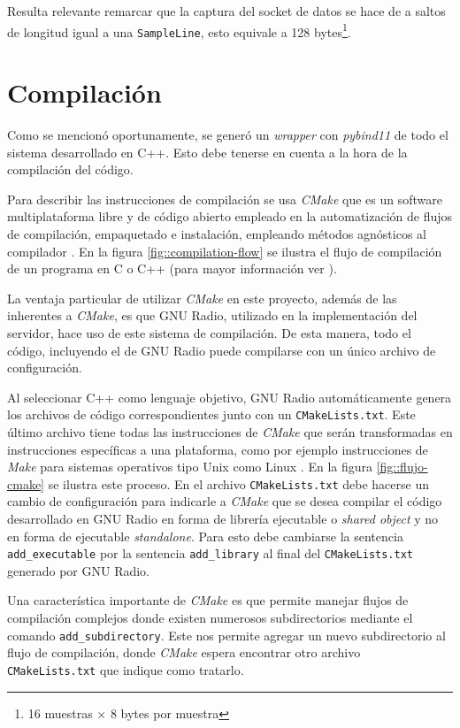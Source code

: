 \documentclass[../../main.tex]{subfiles}
\begin{document}
Resulta relevante remarcar que la captura del socket de datos se hace de a saltos de longitud igual a una \texttt{SampleLine}, esto equivale a 128 bytes\footnote{16 muestras $\times$ 8 bytes por muestra}.

\section{Compilación}
Como se mencionó oportunamente, se generó un \textit{wrapper} con \textit{pybind11} de todo el sistema desarrollado en C++. Esto debe tenerse en cuenta a la hora de la compilación del código.

Para describir las instrucciones de compilación se usa \textit{CMake} que es un software multiplataforma libre y de código abierto empleado en la automatización de flujos de compilación, empaquetado e instalación, empleando métodos agnósticos al compilador \cite{CMake}. En la figura \ref{fig::compilation-flow} se ilustra el flujo de compilación de un programa en C o C++ (para mayor información ver \cite{computer-systems}).

La ventaja particular de utilizar \textit{CMake} en este proyecto, además de las inherentes a \textit{CMake}, es que GNU Radio, utilizado en la implementación del servidor, hace uso de este sistema de compilación. De esta manera, todo el código, incluyendo el de GNU Radio puede compilarse con un único archivo de configuración.

Al seleccionar C++ como lenguaje objetivo, GNU Radio automáticamente genera los archivos de código correspondientes junto con un \texttt{CMakeLists.txt}. Este último archivo tiene todas las instrucciones de \textit{CMake} que serán transformadas en instrucciones específicas a una plataforma, como por ejemplo instrucciones de \textit{Make} para sistemas operativos tipo Unix como Linux \cite{Make}. En la figura \ref{fig::flujo-cmake} se ilustra este proceso.
En el archivo \texttt{CMakeLists.txt} debe hacerse un cambio de configuración para indicarle a \textit{CMake} que se desea compilar el código desarrollado en GNU Radio en forma de librería ejecutable o \textit{shared object} y no en forma de ejecutable \textit{standalone}. Para esto debe cambiarse la sentencia \texttt{add\_executable} por la sentencia \texttt{add\_library} al final del \texttt{CMakeLists.txt} generado por GNU Radio.

Una característica importante de \textit{CMake} es que permite manejar flujos de compilación complejos donde existen numerosos subdirectorios mediante el comando \texttt{add\_subdirectory}. Este nos permite agregar un nuevo subdirectorio al flujo de compilación, donde \textit{CMake} espera encontrar otro archivo \texttt{CMakeLists.txt} que indique como tratarlo. 
\end{document}

